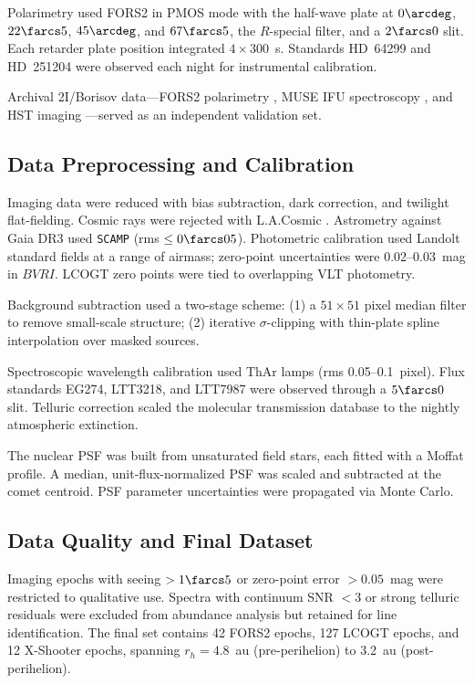 \documentclass[preprint2]{aastex631}
\begin{document}
Polarimetry used FORS2 in PMOS mode with the half-wave plate at $0\arcdeg$, $22\farcs5$, $45\arcdeg$, and $67\farcs5$, the $R$-special filter, and a $2\farcs0$ slit. Each retarder plate position integrated $4 \times 300$~s. Standards HD~64299 and HD~251204 were observed each night for instrumental calibration.

Archival 2I/Borisov data---FORS2 polarimetry \citep{bagnulo22}, MUSE IFU spectroscopy \citep{opitom20}, and HST imaging \citep{jewitt20}---served as an independent validation set.

\subsection{Data Preprocessing and Calibration}

Imaging data were reduced with bias subtraction, dark correction, and twilight flat-fielding. Cosmic rays were rejected with L.A.Cosmic \citep{vandokkum01}. Astrometry against Gaia DR3 used \texttt{SCAMP} \citep{bertin06} (rms $\leq 0\farcs05$). Photometric calibration used Landolt standard fields at a range of airmass; zero-point uncertainties were 0.02--0.03~mag in $BVRI$. LCOGT zero points were tied to overlapping VLT photometry.

Background subtraction used a two-stage scheme: (1) a $51 \times 51$ pixel median filter to remove small-scale structure; (2) iterative $\sigma$-clipping with thin-plate spline interpolation over masked sources.

Spectroscopic wavelength calibration used ThAr lamps (rms 0.05--0.1~pixel). Flux standards EG274, LTT3218, and LTT7987 were observed through a $5\farcs0$ slit. Telluric correction scaled the molecular transmission database \citep{moehler14} to the nightly atmospheric extinction.

The nuclear PSF was built from unsaturated field stars, each fitted with a Moffat profile. A median, unit-flux-normalized PSF was scaled and subtracted at the comet centroid. PSF parameter uncertainties were propagated via Monte Carlo.

\subsection{Data Quality and Final Dataset}

Imaging epochs with seeing $>1\farcs5$ or zero-point error $>0.05$~mag were restricted to qualitative use. Spectra with continuum SNR $<3$ or strong telluric residuals were excluded from abundance analysis but retained for line identification. The final set contains 42 FORS2 epochs, 127 LCOGT epochs, and 12 X-Shooter epochs, spanning $r_h = 4.8$~au (pre-perihelion) to 3.2~au (post-perihelion).
\end{document}
